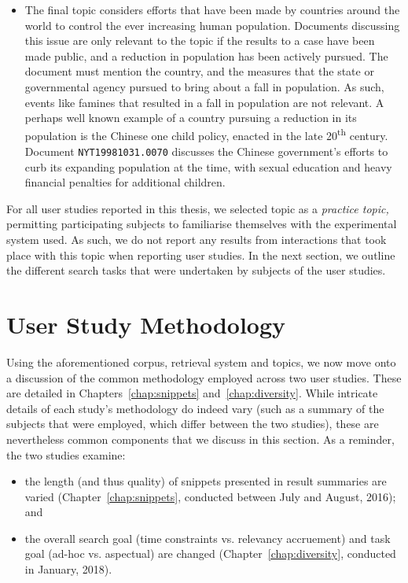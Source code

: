 \begin{itemize}
    \item{ The final topic considers efforts that have been made by countries around the world to control the ever increasing human population. Documents discussing this issue are only relevant to the topic if the results to a case have been made public, and a reduction in population has been actively pursued. The document must mention the country, and the measures that the state or governmental agency pursued to bring about a fall in population. As such, events like famines that resulted in a fall in population are not relevant. A perhaps well known example of a country pursuing a reduction in its population is the Chinese one child policy, enacted in the late 20\textsuperscript{th} century. Document \texttt{NYT19981031.0070} discusses the Chinese government's efforts to curb its expanding population at the time, with sexual education and heavy financial penalties for additional children.}
    
\end{itemize}

\vspace*{-3mm}
For all user studies reported in this thesis, we selected topic  as a \emph{practice topic,} permitting participating subjects to familiarise themselves with the experimental system used. As such, we do not report any results from interactions that took place with this topic when reporting user studies. In the next section, we outline the different search tasks that were undertaken by subjects of the user studies.

\section{User Study Methodology}\label{sec:methodology:user}
Using the aforementioned corpus, retrieval system and topics, we now move onto a discussion of the common methodology employed across two user studies. These are detailed in Chapters~\ref{chap:snippets} and~\ref{chap:diversity}. While intricate details of each study's methodology do indeed vary (such as a summary of the subjects that were employed, which differ between the two studies), these are nevertheless common components that we discuss in this section. As a reminder, the two studies examine:

\begin{itemize}
    \item{the length (and thus quality) of snippets presented in result summaries are varied (Chapter~\ref{chap:snippets}, conducted between July and August, 2016); and}

    \item{the overall search goal (time constraints vs. relevancy accruement) and task goal (ad-hoc vs. aspectual) are changed (Chapter~\ref{chap:diversity}, conducted in January, 2018).}
\end{itemize}
\vspace*{-4mm}

